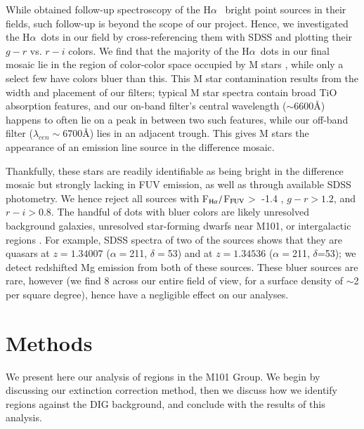 \documentclass[iop]{emulateapj}
\newcommand{\ha}{H$\alpha$}
\newcommand{\hafuv}{F$_{\rm H\alpha}/$F$_{\rm FUV}$}
\begin{document}
While \citet{kellar12} obtained follow-up spectroscopy of the \ha
\ bright point sources in their fields, such follow-up is beyond the
scope of our project.  Hence, we investigated the \ha \ dots in our
field by cross-referencing them with SDSS and plotting their $g-r$
vs. $r-i$ colors.  We find that the majority of the \ha \ dots in our
final mosaic lie in the region of color-color space occupied by M
stars \citep[Figure 1 of][]{finlator00}, while only a select few have
colors bluer than this.  This M star contamination results from the
width and placement of our filters; typical M star spectra contain
broad TiO absorption features, and our on-band filter's central
wavelength ($\sim$6600\AA) happens to often lie on a peak in between
two such features, while our off-band filter ($\lambda_{cen}
\sim$6700\AA) lies in an adjacent trough.  This gives M stars the
appearance of an emission line source in the difference mosaic.

Thankfully, these stars are readily identifiable as being bright in
the difference mosaic but strongly lacking in FUV emission, as well as
through available SDSS photometry.  We hence reject all sources with
\hafuv $>$ -1.4 \citep[this cutoff is also justified by Starburst99
  models, which never reach \hafuv \ higher than
  this;][]{leitherer99}, $g-r > 1.2$, and $r-i > 0.8$.  The handful of
dots with bluer colors are likely unresolved background galaxies,
unresolved star-forming dwarfs near M101, or intergalactic 
regions \citep{kellar12}.  For example, SDSS spectra of two of the
sources shows that they are quasars at $z=1.34007$
($\alpha=$211, $\delta=$53) and at $z=1.34536$
($\alpha=$211, $\delta$=53); we detect redshifted Mg
emission from both of these sources.  These bluer sources are rare,
however (we find 8 across our entire field of view, for a surface
density of $\sim$2 per square degree), hence have a negligible effect
on our analyses.


\section{Methods}
We present here our analysis of  regions in the M101 Group.
We begin by discussing our extinction correction method, then we
discuss how we identify  regions against the DIG background,
and conclude with the results of this analysis.
\end{document}
